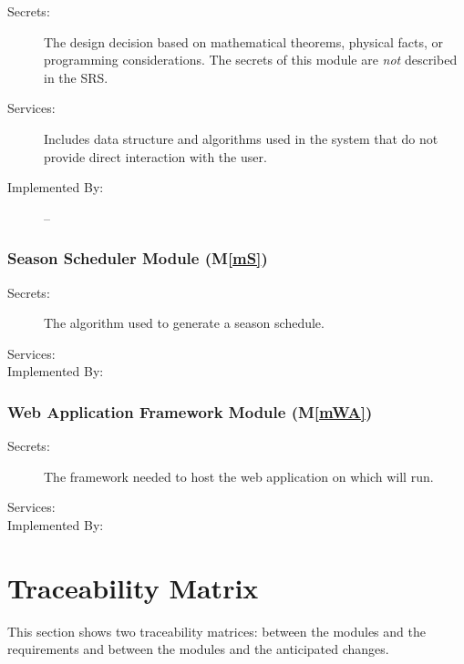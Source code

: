 \documentclass[12pt, titlepage]{article}
\newcommand{\mref}[1]{M\ref{#1}}
\begin{document}
\begin{description}
  \item[Secrets:] The design decision based on mathematical theorems, physical
    facts, or programming considerations. The secrets of this module are
    \emph{not} described in the SRS.
  \item[Services:] Includes data structure and algorithms used in the system that
    do not provide direct interaction with the user. 
  \item[Implemented By:] --
\end{description}

\subsubsection{Season Scheduler Module (\mref{mS})}

\begin{description}
  \item[Secrets:]The algorithm used to generate a season schedule.
  \item[Services:]
  \item[Implemented By:] \progname{}
\end{description}

\subsubsection{Web Application Framework Module (\mref{mWA})}

\begin{description}
  \item[Secrets:]The framework needed to host the web application on which
  \progname{} will run.
  \item[Services:]
  \item[Implemented By:] \progname{}
\end{description}

\section{Traceability Matrix} \label{SecTM}

This section shows two traceability matrices: between the modules and the
requirements and between the modules and the anticipated changes.
\end{document}
